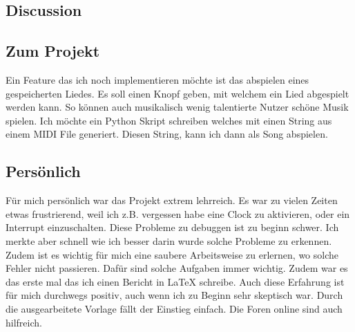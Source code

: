 \documentclass[
   10.5pt,
   invert-title=true,
   titlepage=false,
   titleimage-ratio=13,
   class=article
]{bfhpub}				%
\begin{document}
\begin{multicols}{2}
\section*{Discussion}
\subsection*{Zum Projekt}
Ein Feature das ich noch implementieren möchte ist das abspielen eines gespeicherten Liedes. Es soll einen Knopf geben, mit welchem ein Lied abgespielt werden kann. So können auch musikalisch wenig talentierte Nutzer schöne Musik spielen. Ich möchte ein Python Skript schreiben welches mit einen String aus einem MIDI File generiert. Diesen String, kann ich dann als Song abspielen. 
\subsection*{Persönlich}
Für mich persönlich war das Projekt extrem lehrreich. Es war zu vielen Zeiten etwas frustrierend, weil ich z.B. vergessen habe eine Clock zu aktivieren, oder ein Interrupt einzuschalten. Diese Probleme zu debuggen ist zu beginn schwer. Ich merkte aber schnell wie ich besser darin wurde solche Probleme zu erkennen. Zudem ist es wichtig für mich eine saubere Arbeitsweise zu erlernen, wo solche Fehler nicht passieren. Dafür sind solche Aufgaben immer wichtig. Zudem war es das erste mal das ich einen Bericht in LaTeX schreibe. Auch diese Erfahrung ist für mich durchwegs positiv, auch wenn ich zu Beginn sehr skeptisch war. Durch die ausgearbeitete Vorlage fällt der Einstieg einfach. Die Foren online sind auch hilfreich.

\end{multicols}

\end{document}
